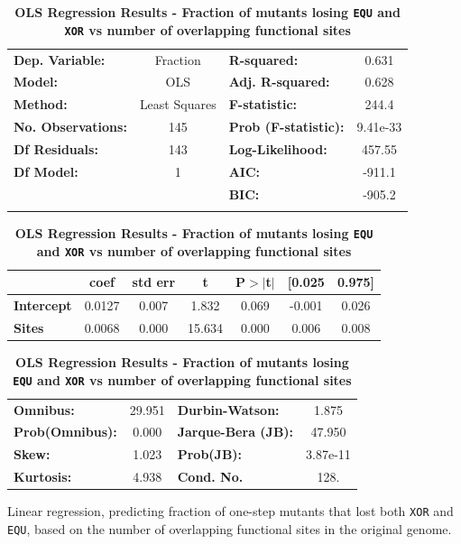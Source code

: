 \documentclass[10pt,letterpaper,final]{article}
\begin{document}
	\begin{table}[h]
	\centering
	\caption{\textbf{OLS Regression Results - Fraction of mutants losing \texttt{EQU} and \texttt{XOR} vs number of overlapping functional sites}}
	\label{ce-olsregression-1step-XOREQU-h}
	\begin{tabular}{lclc}
	\toprule
	\textbf{Dep. Variable:}    &     Fraction     & \textbf{  R-squared:         } &     0.631   \\
	\textbf{Model:}            &       OLS        & \textbf{  Adj. R-squared:    } &     0.628   \\
	\textbf{Method:}           &  Least Squares   & \textbf{  F-statistic:       } &     244.4   \\
	\textbf{No. Observations:} &         145      & \textbf{  Prob (F-statistic):} &  9.41e-33   \\
	\textbf{Df Residuals:}     &         143      & \textbf{  Log-Likelihood:    } &    457.55   \\
	\textbf{Df Model:}         &           1      & \textbf{  AIC:               } &    -911.1   \\
	&      & \textbf{  BIC:               } &    -905.2   \\
	&      & \textbf{                     } &             \\
	\bottomrule
	\end{tabular}
	\begin{tabular}{lcccccc}
	                   & \textbf{coef} & \textbf{std err} & \textbf{t} & \textbf{P$>$$|$t$|$} & \textbf{[0.025} & \textbf{0.975]}  \\
	\midrule
	\textbf{Intercept} &       0.0127  &        0.007     &     1.832  &         0.069        &       -0.001    &        0.026     \\
	\textbf{Sites}     &       0.0068  &        0.000     &    15.634  &         0.000        &        0.006    &        0.008     \\
	\bottomrule
	\end{tabular}
	\begin{tabular}{lclc}
	\textbf{Omnibus:}       & 29.951 & \textbf{  Durbin-Watson:     } &    1.875  \\
	\textbf{Prob(Omnibus):} &  0.000 & \textbf{  Jarque-Bera (JB):  } &   47.950  \\
	\textbf{Skew:}          &  1.023 & \textbf{  Prob(JB):          } & 3.87e-11  \\
	\textbf{Kurtosis:}      &  4.938 & \textbf{  Cond. No.          } &     128.  \\
	\bottomrule
	\end{tabular}
	\begin{flushleft}Linear regression, predicting fraction of one-step mutants that lost both \texttt{XOR} and \texttt{EQU}, based on the number of overlapping functional sites in the original genome.  
	\end{flushleft}
	\label{ce-olsregression-1step-XOREQU}
	\end{table}
\end{document}
